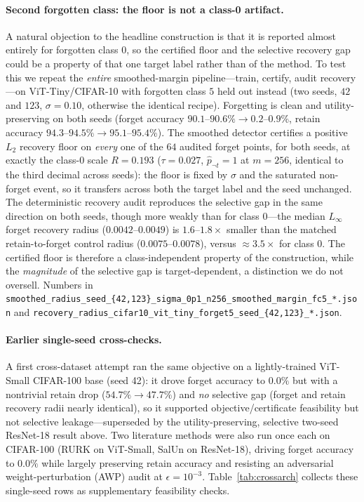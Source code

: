 \documentclass{article}
\begin{document}
\paragraph{Second forgotten class: the floor is not a class-0 artifact.}
A natural objection to the headline construction is that it is reported almost
entirely for forgotten class $0$, so the certified floor and the selective
recovery gap could be a property of that one target label rather than of the
method. To test this we repeat the \emph{entire} smoothed-margin pipeline---train,
certify, audit recovery---on ViT-Tiny/CIFAR-10 with forgotten class $5$ held out
instead (two seeds, $42$ and $123$, $\sigma=0.10$, otherwise the identical recipe).
Forgetting is clean and utility-preserving on both seeds (forget accuracy
$90.1$--$90.6\%\!\to\!0.2$--$0.9\%$, retain accuracy $94.3$--$94.5\%\!\to\!95.1$--$95.4\%$).
The smoothed detector certifies a positive $L_2$
recovery floor on \emph{every} one of the $64$ audited forget points, for both
seeds, at exactly the class-0 scale $R=0.193$ ($\tau=0.027$, $\hat p_{\neg t}=1$ at
$m=256$, identical to the third decimal across seeds): the
floor is fixed by $\sigma$ and the saturated non-forget event, so it transfers
across both the target label and the seed unchanged. The deterministic recovery
audit reproduces the selective gap in the same direction on both seeds, though more
weakly than for class $0$---the median $L_\infty$ forget recovery radius
($0.0042$--$0.0049$) is $1.6$--$1.8\times$ smaller than the matched
retain-to-forget control radius ($0.0075$--$0.0078$), versus $\approx\!3.5\times$ for
class $0$. The certified floor is therefore a class-independent property of the
construction, while the \emph{magnitude} of the selective gap is target-dependent,
a distinction we do not oversell. Numbers in
\texttt{smoothed\_radius\_seed\_\{42,123\}\_sigma\_0p1\_n256\_smoothed\_margin\_fc5\_*.json}
and \texttt{recovery\_radius\_cifar10\_vit\_tiny\_forget5\_seed\_\{42,123\}\_*.json}.

\paragraph{Earlier single-seed cross-checks.} A first cross-dataset attempt ran
the same objective on a lightly-trained ViT-Small CIFAR-100 base (seed 42): it
drove forget accuracy to $0.0\%$ but with a nontrivial retain drop
($54.7\%\!\to\!47.7\%$) and \emph{no} selective gap (forget and retain recovery
radii nearly identical), so it supported objective/certificate feasibility but
not selective leakage---superseded by the utility-preserving, selective
two-seed ResNet-18 result above. Two literature methods were also run once each
on CIFAR-100 (RURK on ViT-Small, SalUn on ResNet-18), driving forget accuracy to
$0.0\%$ while largely preserving retain accuracy and resisting an adversarial
weight-perturbation (AWP) audit at $\epsilon=10^{-3}$. Table~\ref{tab:crossarch}
collects these single-seed rows as supplementary feasibility checks.
\end{document}
